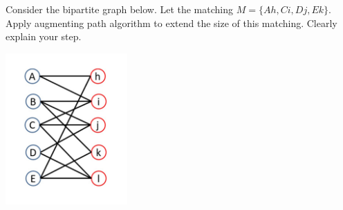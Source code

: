 \question Consider the bipartite graph below. Let the matching
\(M=\{A h, C i, D j, E k\}\). Apply augmenting path algorithm to
extend the size of this matching. Clearly explain your step.

\begin{center}
  \includegraphics[width=0.35\textwidth]{figures/p2-graph}
\end{center}

\begin{solution}
  
\end{solution}
